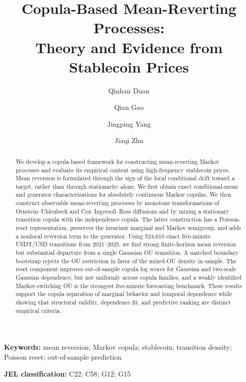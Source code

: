 \documentclass[11pt]{article}
\title{Copula-Based Mean-Reverting Processes:\\
Theory and Evidence from Stablecoin Prices}
\author{Qinhan Duan \and Qian Gao \and Jingping Yang \and Jiaqi Zhu}
\date{}
\theoremstyle{remark}
\newcommand{\1}{\mathbf 1}
\begin{document}
\maketitle

\begin{abstract}
We develop a copula-based framework for constructing mean-reverting Markov
processes and evaluate its empirical content using high-frequency stablecoin
prices.  Mean reversion is formulated through the sign of the local conditional
drift toward a target, rather than through stationarity alone.  We first obtain
exact conditional-mean and generator characterizations for absolutely continuous
Markov copulas.  We then construct observable mean-reverting processes by
monotone transformations of Ornstein--Uhlenbeck and Cox--Ingersoll--Ross
diffusions and by mixing a stationary transition copula with the independence
copula.  The latter construction has a Poisson-reset representation, preserves
the invariant marginal and Markov semigroup, and adds a nonlocal reversion term
to the generator.  Using 524,610 exact five-minute USDT/USD transitions from
2021--2025, we find strong finite-horizon mean reversion but substantial
departure from a single Gaussian OU transition.  A matched boundary bootstrap
rejects the OU restriction in favor of the mixed-OU density in sample.  The
reset component improves out-of-sample copula log scores for Gaussian and
two-scale Gaussian dependence, but not uniformly across copula families, and a
weakly identified Markov-switching OU is the strongest five-minute forecasting
benchmark.  These results support the copula separation of marginal behavior
and temporal dependence while showing that structural validity, dependence fit,
and predictive ranking are distinct empirical criteria.
\end{abstract}

\noindent\textbf{Keywords:} mean reversion; Markov copula; stablecoin; transition density; Poisson reset; out-of-sample prediction

\medskip
\noindent\textbf{JEL classification:} C22; C58; G12; G15









\clearpage


\end{document}
